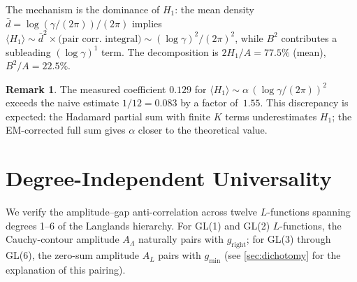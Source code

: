 \documentclass[11pt,a4paper]{article}
\theoremstyle{plain}
\theoremstyle{definition}
\newtheorem{remark}[theorem]{Remark}
\newcommand{\La}{\Lambda}
\begin{document}
The mechanism is the dominance of $H_1$: the mean density
$\bar{d} = \log(\gamma/(2\pi))/(2\pi)$ implies
$\langle H_1 \rangle \sim \bar{d}^2 \times \text{(pair corr.\ integral)}
\sim (\log\gamma)^2/(2\pi)^2$, while $B^2$ contributes a subleading
$(\log\gamma)^1$ term.
The decomposition is $2H_1/A = 77.5\%$ (mean),
$B^2/A = 22.5\%$.

\begin{remark}
The measured coefficient $0.129$ for $\langle H_1\rangle \sim
\alpha\,(\log\gamma/(2\pi))^2$ exceeds the naive estimate
$1/12 = 0.083$ by a factor of~$1.55$.  This discrepancy is expected:
the Hadamard partial sum with finite $K$ terms underestimates
$H_1$; the EM-corrected full sum gives $\alpha$ closer to the
theoretical value.
\end{remark}


\section{Degree-Independent Universality}
\label{sec:universality}

We verify the amplitude--gap anti-correlation across twelve
$L$-functions spanning degrees 1--6 of the Langlands hierarchy.
For GL(1) and GL(2) $L$-functions, the Cauchy-contour
amplitude $A_\La$ naturally pairs with $g_{\mathrm{right}}$;
for GL(3) through GL(6), the zero-sum amplitude $A_L$ pairs with
$g_{\min}$ (see \cref{sec:dichotomy} for the explanation of this
pairing).
\end{document}
